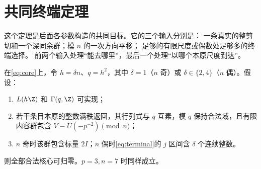 \section{共同终端定理}
这个定理是后面各参数构造的共同目标。它的三个输入分别是：
一条真实的整剪切和一个深同余群；模 $n$ 的一次方向平移；
足够的有限尺度或偶数处足够多的终端选择。
前两个输入处理“能去哪里”，最后一个处理“以哪个本原尺度到达”。

\begin{theorem}[三块核心的共同终端定理]\label{thm:terminal}
在\eqref{eq:core}上，令 $h=\delta n$、$q=h^2$，其中 $\delta=1$（$n$ 奇）或 $\delta\in\{2,4\}$（$n$ 偶）。假设：
\begin{enumerate}
\item $L(h\Z)$ 和 $\Gamma(q,\Z)$ 可实现；
\item 若干条目本原的整数满秩返回，其行列式与 $q$ 互素，模 $q$ 保持合法域，且有限内容群包含 $V\equiv U(-p^{-2})\pmod n$；
\item $n$ 奇时该群包含标量 $2I$；$n$ 偶时\eqref{eq:terminal}的 $j$ 区间含 $\delta$ 个连续整数。
\end{enumerate}
则全部合法核心可归零。$p=3,n=7$ 时同样成立。
\end{theorem}
